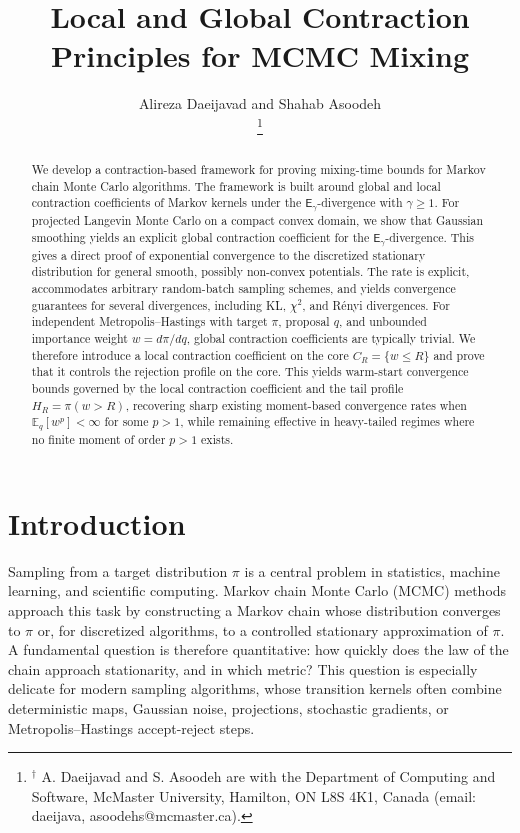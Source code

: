 \documentclass[10pt, journal]{IEEEtran}
\title{Local and Global Contraction Principles for MCMC Mixing}
\author{%
Alireza Daeijavad and
Shahab Asoodeh \\

\thanks{${}^\dagger$ A. Daeijavad and S. Asoodeh are with the Department of Computing and Software, McMaster University, Hamilton,
ON L8S 4K1, Canada (email: {daeijava, asoodehs}@mcmaster.ca).}
}
\date{}
\begin{document}
\onecolumn

\maketitle

\begin{abstract}
We develop a contraction-based framework for proving mixing-time bounds for Markov chain Monte Carlo algorithms. The framework is built around global and local contraction coefficients of Markov kernels under the $\mathsf E_\gamma$-divergence with $\gamma\ge1$. For projected Langevin Monte Carlo on a compact convex domain, we show that Gaussian smoothing yields an explicit global contraction coefficient for the $\mathsf E_\gamma$-divergence. This gives a direct proof of exponential convergence to the discretized stationary distribution for general smooth, possibly non-convex potentials. The rate is explicit, accommodates arbitrary random-batch sampling schemes, and yields convergence guarantees for several divergences, including KL, $\chi^2$, and R\'enyi divergences. 
For independent Metropolis--Hastings with target $\pi$, proposal $q$, and unbounded importance weight $w=d\pi/dq$, global contraction coefficients are typically trivial. We therefore introduce a local contraction coefficient on the core $C_R=\{w\le R\}$ and prove that it controls the rejection profile on the core. This yields warm-start convergence bounds governed by the local contraction coefficient and the tail profile $H_R=\pi(w>R)$, recovering sharp existing moment-based convergence rates when $\mathbb E_q[w^p]<\infty$ for some $p>1$, while remaining effective in heavy-tailed regimes where no finite moment of order $p>1$ exists.
\end{abstract}

\section{Introduction}



Sampling from a target distribution $\pi$ is a central problem in statistics, machine learning, and scientific computing. Markov chain Monte Carlo (MCMC) methods approach this task by constructing a Markov chain whose distribution converges to $\pi$ or, for discretized algorithms, to a controlled stationary approximation of $\pi$. A fundamental question is therefore quantitative: how quickly does the law of the chain approach stationarity, and in which metric? This question is especially delicate for modern sampling algorithms, whose transition kernels often combine deterministic maps, Gaussian noise, projections, stochastic gradients, or Metropolis--Hastings accept-reject steps. 
\end{document}
